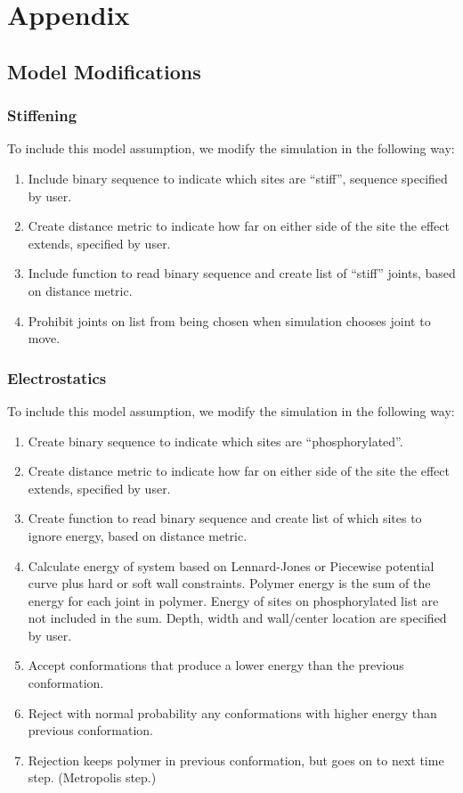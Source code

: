 \documentclass[../AdvancementSummary.tex]{subfiles}
\begin{document}
\section{Appendix}

\subsection{Model Modifications}

\subsubsection{Stiffening}

To include this model assumption, we modify the simulation in the following way:

\begin{enumerate}
\item Include binary sequence to indicate which sites are ``stiff'', sequence specified by user.
\item Create distance metric to indicate how far on either side of the site the effect extends, specified by user.
\item Include function to read binary sequence and create list of ``stiff'' joints, based on distance metric.
\item Prohibit joints on list from being chosen when simulation chooses joint to move.
\end{enumerate}


\subsubsection{Electrostatics}

To include this model assumption, we modify the simulation in the following way:

\begin{enumerate}
\item Create binary sequence to indicate which sites are ``phosphorylated''.
\item Create distance metric to indicate how far on either side of the site the effect extends, specified by user.
\item Create function to read binary sequence and create list of which sites to ignore energy, based on distance metric.
\item Calculate energy of system based on Lennard-Jones or Piecewise potential curve plus hard or soft wall constraints.
\subitem Polymer energy is the sum of the energy for each joint in polymer.
\subitem Energy of sites on phosphorylated list are not included in the sum.
\subitem Depth, width and wall/center location are specified by user.
\item Accept conformations that produce a lower energy than the previous conformation.
\item Reject with normal probability any conformations with higher energy than previous conformation.
\item Rejection keeps polymer in previous conformation, but goes on to next time step. (Metropolis step.)
\end{enumerate}
\end{document}
